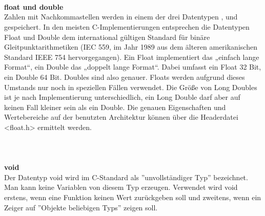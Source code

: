 \ \\
\\
\ \\
\textbf{float und double}\\
Zahlen mit Nachkommastellen werden in einem der drei Datentypen ,  und  gespeichert. In den meisten C-Implementierungen entsprechen die Datentypen Float und Double dem international gültigen Standard für binäre Gleitpunktarithmetiken (IEC 559, im Jahr 1989 aus dem älteren amerikanischen Standard IEEE 754 hervorgegangen). Ein Float implementiert das „einfach lange Format“, ein Double das „doppelt lange Format“. Dabei umfasst ein Float 32 Bit, ein Double 64 Bit. Doubles sind also genauer. Floats werden aufgrund dieses Umstands nur noch in speziellen Fällen verwendet. Die Größe von Long Doubles ist je nach Implementierung unterschiedlich, ein Long Double darf aber auf keinen Fall kleiner sein als ein Double. Die genauen Eigenschaften und Wertebereiche auf der benutzten Architektur können über die Headerdatei <float.h> ermittelt werden.\\
\ \\
\\
\ \\
\textbf{void}\\
Der Datentyp void wird im C-Standard als ''unvollständiger Typ'' bezeichnet. Man kann keine Variablen von diesem Typ erzeugen. Verwendet wird void erstens, wenn eine Funktion keinen Wert zurückgeben soll und zweitens, wenn ein Zeiger auf ''Objekte beliebigen Typs'' zeigen soll.\\
\ \\
\\
